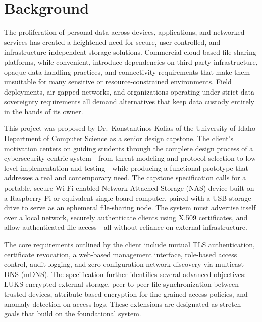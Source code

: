 \documentclass[12pt,letterpaper]{report}
\begin{document}

\chapter{Background}

The proliferation of personal data across devices, applications, and networked services has created a heightened need for secure, user-controlled, and infrastructure-independent storage solutions. Commercial cloud-based file sharing platforms, while convenient, introduce dependencies on third-party infrastructure, opaque data handling practices, and connectivity requirements that make them unsuitable for many sensitive or resource-constrained environments. Field deployments, air-gapped networks, and organizations operating under strict data sovereignty requirements all demand alternatives that keep data custody entirely in the hands of its owner.

This project was proposed by Dr.\ Konstantinos Kolias of the University of Idaho Department of Computer Science as a senior design capstone. The client's motivation centers on guiding students through the complete design process of a cybersecurity-centric system---from threat modeling and protocol selection to low-level implementation and testing---while producing a functional prototype that addresses a real and contemporary need. The capstone specification calls for a portable, secure Wi-Fi-enabled Network-Attached Storage (NAS) device built on a Raspberry Pi or equivalent single-board computer, paired with a USB storage drive to serve as an ephemeral file-sharing node. The system must advertise itself over a local network, securely authenticate clients using X.509 certificates, and allow authenticated file access---all without reliance on external infrastructure.

The core requirements outlined by the client include mutual TLS authentication, certificate revocation, a web-based management interface, role-based access control, audit logging, and zero-configuration network discovery via multicast DNS (mDNS). The specification further identifies several advanced objectives: LUKS-encrypted external storage, peer-to-peer file synchronization between trusted devices, attribute-based encryption for fine-grained access policies, and anomaly detection on access logs. These extensions are designated as stretch goals that build on the foundational system.
\end{document}
